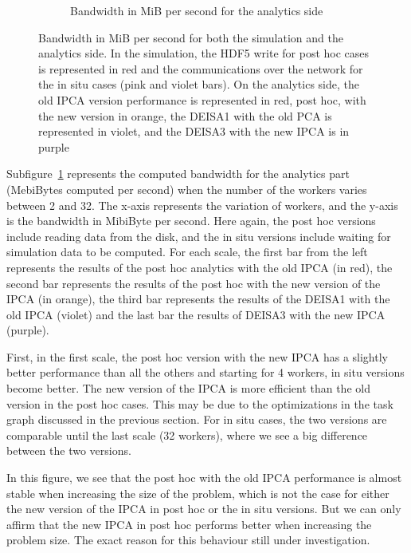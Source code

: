 \begin{figure}[hb]
\begin{subfigure}[b]{0.45\textwidth}
         \caption{Bandwidth in MiB per second for the analytics side}
         \label{fig:A}
     \end{subfigure}
        \caption{Bandwidth in MiB per second for both the simulation and the analytics side. In the simulation, the HDF5 write for post hoc cases is represented in red and the communications over the network for the in situ cases (pink and violet bars). On the analytics side, the old IPCA version performance is represented in red, post hoc, with the new version in orange, the DEISA1 with the old PCA is represented in violet, and the DEISA3 with the new IPCA is in purple}
        \label{fig:perf_procs_variability}
\end{figure}

Subfigure~\ref{fig:A} represents the computed bandwidth for the analytics part (MebiBytes computed per second) when the number of the \dask workers varies between 2 and 32.
The x-axis represents the variation of \dask workers, and the y-axis is the bandwidth in MibiByte per second. Here again, the post hoc versions include reading data from the disk, and the in situ versions include waiting for simulation data to be computed.
For each scale, the first bar from the left represents the results of the post hoc analytics with the old IPCA (in red), the second bar represents the results of the post hoc with the new version of the IPCA (in orange), the third bar represents the results of the DEISA1 with the old IPCA (violet) and the last bar the results of DEISA3 with the new IPCA (purple).  

First, in the first scale, the post hoc version with the new IPCA has a slightly better performance than all the others and starting for 4 workers, in situ versions become better. 
The new version of the IPCA is more efficient than the old version in the post hoc cases. This may be due to the optimizations in the task graph discussed in the  previous section. 
For in situ cases, the two versions are comparable until the last scale (32 workers), where we see a big difference between the two versions.  

In this figure, we see that the post hoc with the old IPCA performance is almost stable when increasing the size of the problem, which is not the case for either the new version of the IPCA in post hoc or the in situ versions. 
But we can only affirm that the new IPCA in post hoc performs better when increasing the problem size. The exact reason for this behaviour still under investigation.

